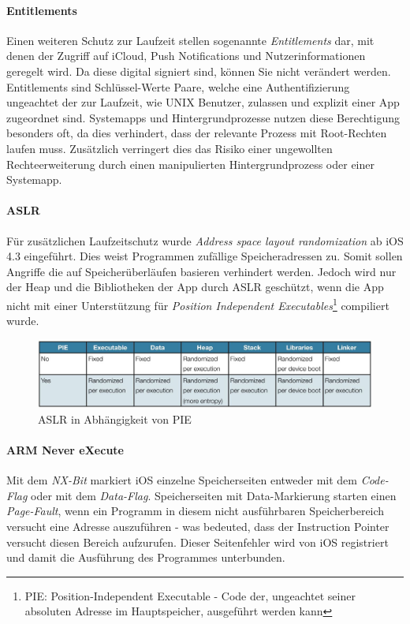 		\paragraph{Entitlements}
			Einen weiteren Schutz zur Laufzeit stellen sogenannte \textsl{Entitlements}
			dar, mit denen der Zugriff auf iCloud, Push	Notifications und
			Nutzerinformationen geregelt wird. Da diese digital signiert sind, können Sie
			nicht verändert werden. Entitlements sind Schlüssel-Werte Paare, welche eine
			Authentifizierung ungeachtet der zur Laufzeit, wie UNIX Benutzer, zulassen
			und explizit einer App zugeordnet sind.
			Systemapps und Hintergrundprozesse nutzen diese Berechtigung besonders oft,
			da dies verhindert, dass der relevante Prozess mit Root-Rechten laufen muss.
			Zusätzlich verringert dies das Risiko einer ungewollten Rechteerweiterung
			durch einen manipulierten Hintergrundprozess oder einer Systemapp.
		
		\paragraph{ASLR}\label{sec:ios-aslr}
			Für zusätzlichen Laufzeitschutz wurde \textsl{Address space layout
			randomization}\cite[S.1]{iOS4SecurityEvalutaion} ab iOS 4.3 eingeführt. Dies
			weist Programmen zufällige Speicheradressen zu. Somit sollen Angriffe die auf
			Speicherüberläufen basieren verhindert werden\cite[S.131]{Levin2012}. Jedoch
			wird nur der Heap und die Bibliotheken der App durch
			ASLR geschützt, wenn die App nicht mit einer Unterstützung für
			\textsl{Position Independent Executables}\footnote{PIE: Position-Independent
			Executable - Code der, ungeachtet seiner absoluten Adresse im Hauptspeicher,
			ausgeführt werden kann} compiliert wurde.
			\begin{figure}[h]
				\centering
				\includegraphics[width=0.9\linewidth]{ios/media/aslr-pie.jpg}
				\caption{ASLR in Abhängigkeit von PIE
				\cite[S.1]{iOS4SecurityEvalutaion}}
				\label{fig:aslr}
			\end{figure}
		
		\paragraph{ARM Never eXecute}
			Mit dem \textsl{NX-Bit} markiert iOS einzelne Speicherseiten entweder mit dem
			\textsl{Code-Flag} oder mit dem \textsl{Data-Flag}. Speicherseiten mit
			Data-Markierung starten einen \textsl{Page-Fault}, wenn ein Programm in
			diesem nicht ausführbaren Speicherbereich versucht eine Adresse auszuführen
			- was bedeuted, dass der Instruction Pointer versucht diesen Bereich
			aufzurufen. Dieser Seitenfehler wird von iOS registriert und damit die
			Ausführung des Programmes unterbunden\cite[S.310]{Levin2012}.